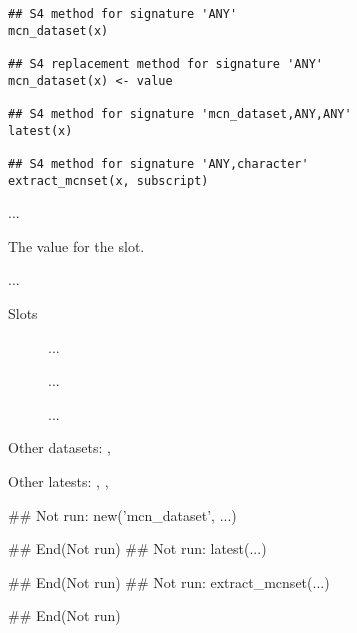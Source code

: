 \documentclass[letterpaper]{book}
\begin{document}
%
\begin{Usage}
\begin{verbatim}
## S4 method for signature 'ANY'
mcn_dataset(x)

## S4 replacement method for signature 'ANY'
mcn_dataset(x) <- value

## S4 method for signature 'mcn_dataset,ANY,ANY'
latest(x)

## S4 method for signature 'ANY,character'
extract_mcnset(x, subscript)
\end{verbatim}
\end{Usage}
%
\begin{Arguments}
\begin{ldescription}
\item[\code{x}] ...

\item[\code{value}] The value for the slot.

\item[\code{subscript}] ...
\end{ldescription}
\end{Arguments}
%
\begin{Section}{Slots}

\begin{description}

\item[] ...

\item[] ...

\item[] ...

\end{description}
\end{Section}
%
\begin{SeeAlso}\relax
Other datasets: 
,

Other latests: 
,
,
\end{SeeAlso}
%
\begin{Examples}
\begin{ExampleCode}
## Not run: 
new('mcn_dataset', ...)

## End(Not run)
## Not run: 
latest(...)

## End(Not run)
## Not run: 
extract_mcnset(...)

## End(Not run)
\end{ExampleCode}
\end{Examples}
\end{document}
